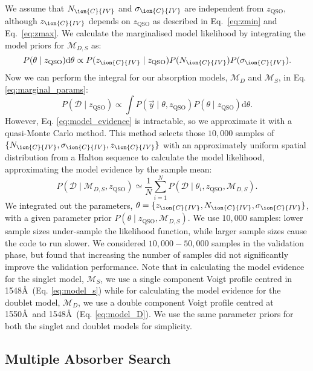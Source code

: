 \documentclass[fleqn,usenatbib]{mnras}
\newcommand{\civ}{\ion{C}{IV}}
\newcommand{\nciv}{N_{\civ}} %
\newcommand{\zciv}{z_{\civ}}
\newcommand{\sciv}{\sigma_{\civ}}
\newcommand{\zqso}{z_{\textrm{QSO}}}
\newcommand{\dd}{\textrm{d}}
\newcommand{\Data}{\mathcal{D}}
\newcommand{\model}{\mathcal{M}}
\begin{document}
We assume that $\nciv$ and $\sciv$ are independent from $\zqso$, although
$\zciv$ depends on $\zqso$ as described in Eq.~\ref{eq:zmin} and Eq.~\ref{eq:zmax}.
We calculate the marginalised model likelihood by integrating the model priors for $\model_{D,S}$ as:
\begin{equation}
  P(\theta \mid \zqso)\dd\theta  \propto P(\zciv \mid \zqso)P(\nciv)P(\sciv).
  \label{eq:pr_model}
\end{equation}
Now we can perform the integral for our absorption models, $\model_D$ and $\model_S$, in Eq. \ref{eq:marginal_params}:
    \begin{equation}
       P(\Data \mid \zqso) \propto
       \int P(\vec{y} \mid \theta, \zqso)
       P(\theta \mid \zqso)\dd\theta.
    \label{eq:model_evidence}
 \end{equation}
However, Eq. \ref{eq:model_evidence} is intractable, so we approximate it
with a quasi-Monte Carlo method. This method selects those $10,000$
samples of $\{\nciv, \sciv, \zciv\}$ with an approximately uniform spatial distribution
from a Halton sequence to calculate the model
likelihood, approximating the model evidence by the sample mean:
 \begin{equation}
     P(\Data \mid \model_{D,S}, \zqso) \simeq
     \frac{1}{N} \sum_{i=1}^{N} P(\Data \mid \theta_i, \zqso, \model_{D,S}).
  \label{eq:model_evidence_qmc}
\end{equation}
We integrated out the parameters, $\theta = \{\zciv,\nciv, \sciv\}$, with
  a given parameter prior $P(\theta \mid \zqso, \model_{D,S})$.
  We use $10,000$ samples: lower sample sizes under-sample the likelihood function, while larger sample sizes cause the code to run slower.
  We considered $10,000 - 50,000$ samples in the validation phase, but found that increasing the number of samples did not significantly improve the validation performance.
  Note that in calculating the model evidence for the singlet model, $\model_S$,
   we use a single component Voigt profile centred in 1548\AA\ (Eq. \ref{eq:model_s}) while for calculating the
  model evidence for the doublet model, $\model_D$, we use a double component Voigt
  profile centred at 1550\AA\ and 1548\AA\ (Eq. \ref{eq:model_D}). We use the same parameter priors for both the singlet and doublet models for simplicity.

\subsection{Multiple Absorber Search}
\label{sec:multiciv}
\end{document}
